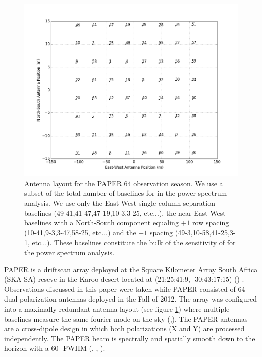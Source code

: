 \documentclass[twocolumn,numberedappendix]{emulateapj} \shorttitle{PSA64}
\begin{document}
\begin{figure}[!t]\centering
\includegraphics[width=\columnwidth]{plots/antenna_positions.png}
\caption{Antenna layout for the PAPER 64 observation season. We use a subset of
the total number of baselines for in the power spectrum analysis. We use only
the East-West single column separation baselines (49-41,41-47,47-19,10-3,3-25,
etc...), the near East-West baselines with a North-South component equaling
$+1$ row spacing (10-41,9-3,3-47,58-25, etc...) and the $-1$ spacing
(49-3,10-58,41-25,3-1, etc...). These baselines constitute the bulk of the
sensitivity of for the power spectrum analysis.}
\label{fig:antenna_positions}
\end{figure}


PAPER is a driftscan array deployed at the Square Kilometer Array South Africa
(SKA-SA) reseve in the Karoo desert located at (21:25:41:9,
-30:43:17:15) (\cite{parsons_et_al2010}) . Observations discussed in this paper
were taken while PAPER consisted of 64 dual polarization antennas deployed in
the Fall of 2012. The array was configured into a maximally redundant antenna
layout (see figure \ref{fig:antenna_positions}) where multiple baselines measure
the same fourier mode on the sky
(\cite{parsons_et_al2012a},\cite{parsons_et_al2014}). The PAPER antennas are a
cross-dipole design in which both polarizations (X and Y) are processed
independently. The PAPER beam is spectrally and spatially smooth down to the
horizon with a $60^{\circ}$ FWHM (\cite{jacobs_et_al2011},
\cite{parsons_et_al2010}, \cite{stefan_et_al2013}). 
\end{document}
